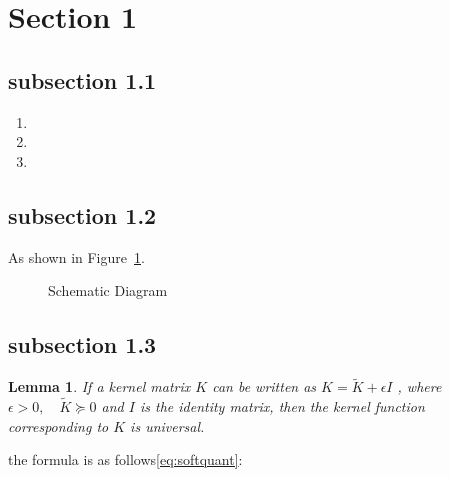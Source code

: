 \documentclass[10pt,letterpaper,onecolumn,fontset=none]{ctexart} %
\newtheorem{lemma}{Lemma}[subsection]
\begin{document}
\section{Section 1}
\lipsum[17] %
\subsection{subsection 1.1}
\lipsum[16]
\begin{enumerate}[itemindent=0pt,topsep=0pt,leftmargin=*,parsep=0pt,itemsep=0pt,label=(\arabic*)]
	\item \lipsum[2]
	\item \lipsum[2]
	\item \lipsum[3]
\end{enumerate}

\subsection{subsection 1.2}
\lipsum[11] %
As shown in Figure~\ref{fig1}.

\begin{figure}[H]
	\centering
	\vfill
	\qquad
	\caption{Schematic Diagram} %
	\label{fig1} 
\end{figure}

\subsection{subsection 1.3}
\lipsum[22]
\begin{lemma} \label{Kexist}
    If a kernel matrix $K$ can be written as $K=\tilde{K}+\epsilon I$ , where $\epsilon > 0,\quad \tilde{K} \succeq 0$ and $I$ is the identity matrix, then the kernel function corresponding to $K$ is universal\cite{zjugradthesisrules}.
\end{lemma}
\lipsum[5]   %
\par the formula is as follows\ref{eq:softquant}:
\end{document}
